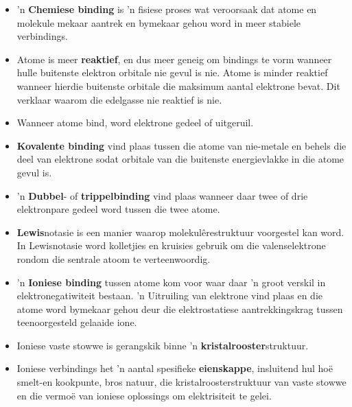 
            \nopagebreak
\begin{itemize}[noitemsep]
\item 'n \textbf{Chemiese binding} is 'n fisiese proses wat veroorsaak dat atome en molekule mekaar aantrek en bymekaar gehou word in meer stabiele verbindings.
\item Atome is meer \textbf{reaktief}, en dus meer geneig om bindings te vorm wanneer hulle buitenste elektron orbitale nie gevul is nie. Atome is minder reaktief wanneer hierdie buitenste orbitale die maksimum aantal elektrone bevat. Dit verklaar waarom die edelgasse nie reaktief is nie.
\item Wanneer atome bind, word elektrone gedeel of uitgeruil.
\item \textbf{Kovalente binding} vind plaas tussen die atome van nie-metale en behels die deel van elektrone sodat orbitale van die buitenste energievlakke in die atome gevul is.
\item 'n \textbf{Dubbel}- of \textbf{trippelbinding} vind plaas wanneer daar twee of drie elektronpare gedeel word tussen die twee atome.
\item \textbf{Lewis}notasie is een manier waarop molekulêrestruktuur voorgestel kan word. In Lewisnotasie word kolletjies en kruisies gebruik om die valenselektrone rondom die sentrale atoom te verteenwoordig.
\item 'n \textbf{Ioniese binding} tussen atome kom voor waar daar 'n groot verskil in elektronegatiwiteit bestaan. 'n Uitruiling van elektrone vind plaas en die atome word bymekaar gehou deur die elektrostatiese  aantrekkingskrag tussen teenoorgesteld gelaaide ione.
\item Ioniese vaste stowwe is gerangskik binne 'n \textbf{kristalrooster}struktuur.
\item Ioniese verbindings het 'n aantal spesifieke \textbf{eienskappe}, insluitend hul hoë smelt-en kookpunte, bros natuur, die kristalroosterstruktuur van vaste stowwe en die vermo\"{e} van ioniese oplossings om elektrisiteit te gelei.

\end{itemize}
